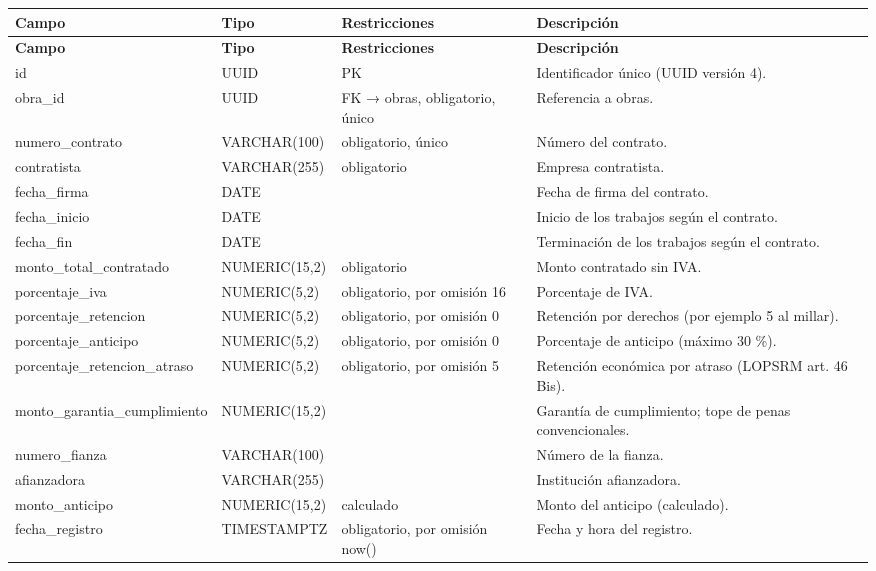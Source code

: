 \begin{xltabular}{\linewidth}{@{}>{\ttfamily\footnotesize}p{4.9cm}>{\ttfamily\footnotesize}p{2.4cm}>{\raggedright\arraybackslash\footnotesize}p{3.3cm}>{\footnotesize}X@{}}
\toprule\normalfont\sffamily\bfseries\footnotesize Campo & \normalfont\sffamily\bfseries\footnotesize Tipo & \sffamily\bfseries Restricciones & \sffamily\bfseries Descripción\\\midrule\endfirsthead
\toprule\normalfont\sffamily\bfseries\footnotesize Campo & \normalfont\sffamily\bfseries\footnotesize Tipo & \sffamily\bfseries Restricciones & \sffamily\bfseries Descripción\\\midrule\endhead
\bottomrule\endfoot
id & UUID & PK & Identificador único (UUID versión 4).\\
obra\_id & UUID & FK → obras, obligatorio, único & Referencia a obras.\\
numero\_contrato & VARCHAR(100) & obligatorio, único & Número del contrato.\\
contratista & VARCHAR(255) & obligatorio & Empresa contratista.\\
fecha\_firma & DATE &  & Fecha de firma del contrato.\\
fecha\_inicio & DATE &  & Inicio de los trabajos según el contrato.\\
fecha\_fin & DATE &  & Terminación de los trabajos según el contrato.\\
monto\_total\_contratado & NUMERIC(15,2) & obligatorio & Monto contratado sin IVA.\\
porcentaje\_iva & NUMERIC(5,2) & obligatorio, por omisión 16 & Porcentaje de IVA.\\
porcentaje\_retencion & NUMERIC(5,2) & obligatorio, por omisión 0 & Retención por derechos (por ejemplo 5 al millar).\\
porcentaje\_anticipo & NUMERIC(5,2) & obligatorio, por omisión 0 & Porcentaje de anticipo (máximo 30 \%).\\
porcentaje\_retencion\_atraso & NUMERIC(5,2) & obligatorio, por omisión 5 & Retención económica por atraso (LOPSRM art. 46 Bis).\\
monto\_garantia\_cumplimiento & NUMERIC(15,2) &  & Garantía de cumplimiento; tope de penas convencionales.\\
numero\_fianza & VARCHAR(100) &  & Número de la fianza.\\
afianzadora & VARCHAR(255) &  & Institución afianzadora.\\
monto\_anticipo & NUMERIC(15,2) & calculado & Monto del anticipo (calculado).\\
fecha\_registro & TIMESTAMPTZ & obligatorio, por omisión now() & Fecha y hora del registro.\\
\end{xltabular}

